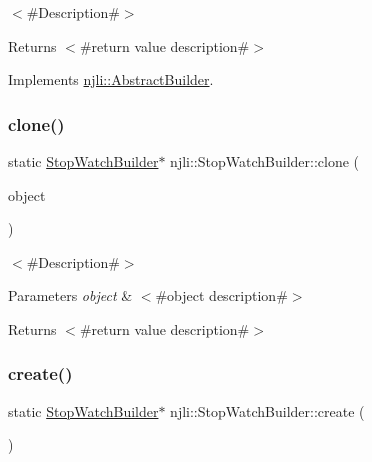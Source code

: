 $<$\#\+Description\#$>$

\begin{DoxyReturn}{Returns}
$<$\#return value description\#$>$ 
\end{DoxyReturn}


Implements \mbox{\hyperlink{classnjli_1_1_abstract_builder_aa1d220053e182c37b31b427499c6eacf}{njli\+::\+Abstract\+Builder}}.

\mbox{\label{classnjli_1_1_stop_watch_builder_a8185811ff452b95bd4e21e38a820c9b5}} 
\subsubsection{\texorpdfstring{clone()}{clone()}}
{\footnotesize\ttfamily static \mbox{\hyperlink{classnjli_1_1_stop_watch_builder}{Stop\+Watch\+Builder}}$\ast$ njli\+::\+Stop\+Watch\+Builder\+::clone (\begin{DoxyParamCaption}\item[{const \mbox{\hyperlink{classnjli_1_1_stop_watch_builder}{Stop\+Watch\+Builder}} \&}]{object }\end{DoxyParamCaption})\hspace{0.3cm}{\ttfamily [static]}}

$<$\#\+Description\#$>$


\begin{DoxyParams}{Parameters}
{\em object} & $<$\#object description\#$>$\\
\hline
\end{DoxyParams}
\begin{DoxyReturn}{Returns}
$<$\#return value description\#$>$ 
\end{DoxyReturn}
\mbox{\label{classnjli_1_1_stop_watch_builder_a40572c1eb3a01561754a0df0174a57b6}} 
\subsubsection{\texorpdfstring{create()}{create()}}
{\footnotesize\ttfamily static \mbox{\hyperlink{classnjli_1_1_stop_watch_builder}{Stop\+Watch\+Builder}}$\ast$ njli\+::\+Stop\+Watch\+Builder\+::create (\begin{DoxyParamCaption}{ }\end{DoxyParamCaption})\hspace{0.3cm}{\ttfamily [static]}}


